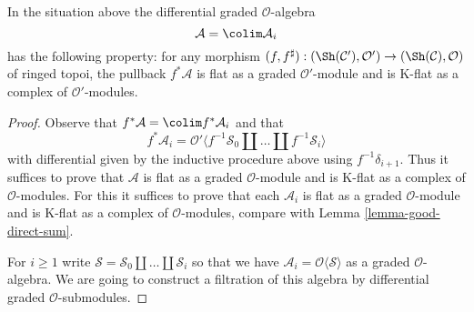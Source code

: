 \begin{lemma}
\label{lemma-special-good}
In the situation above the differential graded $\mathcal{O}$-algebra
$$
\mathcal{A} = \colim \mathcal{A}_i
$$
has the following property: for any morphism
$(f, f^\sharp) : (\Sh(\mathcal{C}'), \mathcal{O}')
\to (\Sh(\mathcal{C}), \mathcal{O})$
of ringed topoi, the pullback $f^*\mathcal{A}$
is flat as a graded $\mathcal{O}'$-module and
is K-flat as a complex of $\mathcal{O}'$-modules.
\end{lemma}

\begin{proof}
Observe that $f^*\mathcal{A} = \colim f^*\mathcal{A}_i$
and that
$$
f^*\mathcal{A}_i = \mathcal{O}'\langle
f^{-1}\mathcal{S}_0 \amalg \ldots \amalg f^{-1}\mathcal{S}_i\rangle
$$
with differential given by the inductive procedure above using
$f^{-1}\delta_{i + 1}$. Thus it suffices to prove that $\mathcal{A}$
is flat as a graded $\mathcal{O}$-module and
is K-flat as a complex of $\mathcal{O}$-modules.
For this it suffices to prove that each $\mathcal{A}_i$
is flat as a graded $\mathcal{O}$-module and
is K-flat as a complex of $\mathcal{O}$-modules, compare with
Lemma \ref{lemma-good-direct-sum}.


\medskip\noindent
For $i \geq 1$
write $\mathcal{S} = \mathcal{S}_0 \amalg \ldots \amalg \mathcal{S}_i$
so that we have $\mathcal{A}_i = \mathcal{O}\langle \mathcal{S} \rangle$
as a graded $\mathcal{O}$-algebra. We are going to construct a filtration
of this algebra by differential graded $\mathcal{O}$-submodules.


\end{proof}
